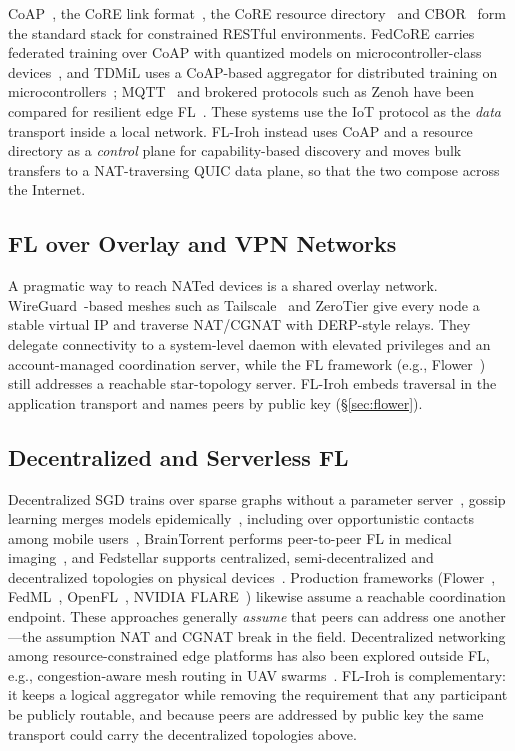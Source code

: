 CoAP~\cite{rfc7252}, the CoRE link format~\cite{rfc6690}, the CoRE resource directory~\cite{rfc9176} and CBOR~\cite{rfc8949} form the standard stack for constrained RESTful environments. FedCoRE carries federated training over CoAP with quantized models on microcontroller-class devices~\cite{djamaa2025}, and TDMiL uses a CoAP-based aggregator for distributed training on microcontrollers~\cite{gulati2024}; MQTT~\cite{mqtt2019} and brokered protocols such as Zenoh have been compared for resilient edge FL~\cite{almeida2025}. These systems use the IoT protocol as the \emph{data} transport inside a local network. FL-Iroh instead uses CoAP and a resource directory as a \emph{control} plane for capability-based discovery and moves bulk transfers to a NAT-traversing QUIC data plane, so that the two compose across the Internet.

\subsection{FL over Overlay and VPN Networks}

A pragmatic way to reach NATed devices is a shared overlay network. WireGuard~\cite{wireguard2017}-based meshes such as Tailscale~\cite{tailscale2023} and ZeroTier give every node a stable virtual IP and traverse NAT/CGNAT with DERP-style relays. They delegate connectivity to a system-level daemon with elevated privileges and an account-managed coordination server, while the FL framework (e.g., Flower~\cite{flower2022}) still addresses a reachable star-topology server. FL-Iroh embeds traversal in the application transport and names peers by public key (\S\ref{sec:flower}).

\subsection{Decentralized and Serverless FL}

Decentralized SGD trains over sparse graphs without a parameter server~\cite{lian2017}, gossip learning merges models epidemically~\cite{hegedus2019}, including over opportunistic contacts among mobile users~\cite{rizzo2026}, BrainTorrent performs peer-to-peer FL in medical imaging~\cite{roy2019braintorrent}, and Fedstellar supports centralized, semi-decentralized and decentralized topologies on physical devices~\cite{martinezbeltran2024}. Production frameworks (Flower~\cite{flower2022}, FedML~\cite{fedml2020}, OpenFL~\cite{openfl2022}, NVIDIA FLARE~\cite{flare2022}) likewise assume a reachable coordination endpoint. These approaches generally \emph{assume} that peers can address one another---the assumption NAT and CGNAT break in the field. Decentralized networking among resource-constrained edge platforms has also been explored outside FL, e.g., congestion-aware mesh routing in UAV swarms~\cite{bakirci2023}. FL-Iroh is complementary: it keeps a logical aggregator while removing the requirement that any participant be publicly routable, and because peers are addressed by public key the same transport could carry the decentralized topologies above.

